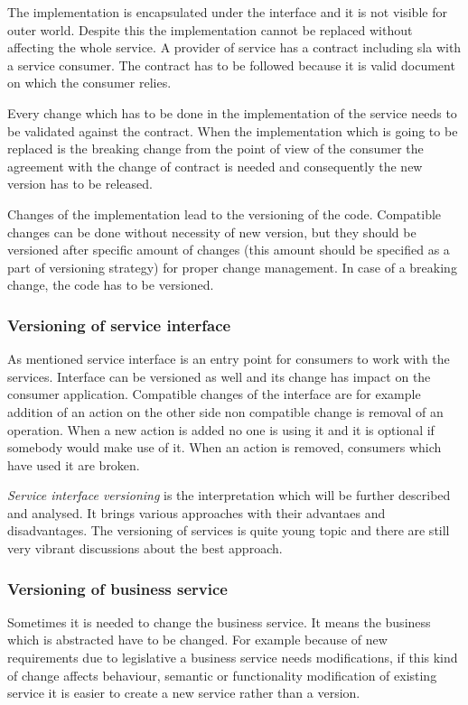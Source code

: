 The implementation is encapsulated under the interface and it is not visible for outer world. Despite this the implementation cannot be replaced without affecting the whole service. A provider of service has a contract including \gls{sla} with a service consumer. The contract has to be followed because it is valid document on which the consumer relies. 

Every change which has to be done in the implementation of the service needs to be validated against the contract. When the implementation which is going to be replaced is the breaking change from the point of view of the consumer the agreement with the change of contract is needed and consequently the new version has to be released.

Changes of the implementation lead to the versioning of the code. Compatible changes can be done without necessity of new version, but they should be versioned after specific amount of changes (this amount should be specified as a part of versioning strategy) for proper change management. In case of a breaking change, the code has to be versioned.

\subsubsection{Versioning of service interface}
As mentioned service interface is an entry point for consumers to work with the services. Interface can be versioned as well and its change has impact on the consumer application. Compatible changes of the interface are for example addition of an action on the other side non compatible change is removal of an operation. When a new action is added no one is using it and it is optional if somebody would make use of it. When an action is removed, consumers which have used it are broken.

\emph{Service interface versioning} is the interpretation which will be further described and analysed. It brings various approaches with their advantaes and disadvantages. The versioning of services is quite young topic and there are still very vibrant discussions about the best approach.

\subsubsection{Versioning of business service}
Sometimes it is needed to change the business service. It means the business which is abstracted have to be changed. For example because of new requirements due to legislative a business service needs modifications, if this kind of change affects behaviour, semantic or functionality modification of existing service it is easier to create a new service rather than a version. 

